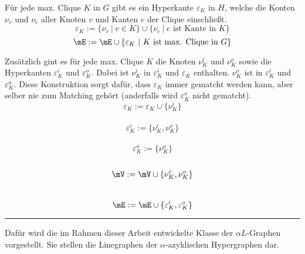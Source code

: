Für jede max. Clique $K$ in $G$ gibt es ein Hyperkante $\varepsilon_K$ in $H$, welche die Konten $\nu_v$ und $\nu_e$ aller Knoten $v$ und Kanten $e$ der Clique einschließt. $$\varepsilon_K := \{\nu_v\ |\ v \in K\} \cup \{\nu_e\ |\ \text{$e$ ist Kante in $K$}\}$$ $$\mE:=\mE\cup \{\varepsilon_K\ |\ \text{$K$ ist max. Clique in $G$} \}$$

Zusätzlich gint es für jede max. Clique $K$ die Knoten $\nu_K^i$ und $\nu_K^o$ sowie die Hyperkanten $\varepsilon_K^i$ und $\varepsilon_K^o$. Dabei ist $\nu_K^i$ in $\varepsilon_K^i$ und $\varepsilon_K$ enthalten. $\nu_K^o$ ist in $\varepsilon_K^i$ und $\varepsilon_K^o$. Diese Konstruktion sorgt dafür, dass $\varepsilon_K$ immer gematcht werden kann, aber selber nie zum Matching gehört (anderfalls wird $\varepsilon_K^o$ nicht gematcht).
$$\varepsilon_K:=\varepsilon_K\cup\{\nu_K^i\}$$ \\
$$\varepsilon_K^i:=\{\nu_K^i,\nu_K^o\}$$ \\
$$\varepsilon_K^o:=\{\nu_K^o\}$$ \\
$$\mV:=\mV\cup \{\nu_K^i,\nu_K^o\}$$ \\
$$\mE:=\mE\cup\{\varepsilon_K^i,\varepsilon_K^o\}$$

\rule{\linewidth}{1pt}
\clearpage

Dafür wird die im Rahmen dieser Arbeit entwickelte Klasse der $\alpha L$-Graphen vorgestellt. Sie stellen die Linegraphen der $\alpha$-azyklischen Hypergraphen dar.

